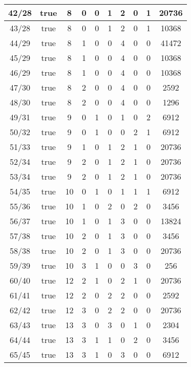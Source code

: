 \begin{frame}
{{\begin{tabular}{|c|c|c|c|c|c|c|c|c|c|}
				\hline
				42/28 & true & 8 & 0 &  0 &  1 &  2 &  0 &  1 & 20736\\
				\hline
				43/28 & true & 8 & 0 &  0 &  1 &  2 &  0 &  1 & 10368\\
				\hline
				44/29 & true & 8 & 1 &  0 &  0 &  4 &  0 &  0 & 41472\\
				\hline
				45/29 & true & 8 & 1 &  0 &  0 &  4 &  0 &  0 & 10368\\
				\hline
				46/29 & true & 8 & 1 &  0 &  0 &  4 &  0 &  0 & 10368\\
				\hline
				47/30 & true & 8 & 2 &  0 &  0 &  4 &  0 &  0 & 2592\\
				\hline
				48/30 & true & 8 & 2 &  0 &  0 &  4 &  0 &  0 & 1296\\
				\hline
				49/31 & true & 9 & 0 &  1 &  0 &  1 &  0 &  2 & 6912\\
				\hline
				50/32 & true & 9 & 0 &  1 &  0 &  0 &  2 &  1 & 6912\\
				\hline
				51/33 & true & 9 & 1 &  0 &  1 &  2 &  1 &  0 & 20736\\
				\hline
				52/34 & true & 9 & 2 &  0 &  1 &  2 &  1 &  0 & 20736\\
				\hline
				53/34 & true & 9 & 2 &  0 &  1 &  2 &  1 &  0 & 20736\\
				\hline
				54/35 & true & 10 & 0 &  1 &  0 &  1 &  1 &  1 & 6912\\
				\hline
				55/36 & true & 10 & 1 &  0 &  2 &  0 &  2 &  0 & 3456\\
				\hline
				56/37 & true & 10 & 1 &  0 &  1 &  3 &  0 &  0 & 13824\\
				\hline
				57/38 & true & 10 & 2 &  0 &  1 &  3 &  0 &  0 & 3456\\
				\hline
				58/38 & true & 10 & 2 &  0 &  1 &  3 &  0 &  0 & 20736\\
				\hline
				59/39 & true & 10 & 3 &  1 &  0 &  0 &  3 &  0 & 256\\
				\hline
				60/40 & true & 12 & 2 &  1 &  0 &  2 &  1 &  0 & 20736\\
				\hline
				61/41 & true & 12 & 2 &  0 &  2 &  2 &  0 &  0 & 2592\\
				\hline
				62/42 & true & 12 & 3 &  0 &  2 &  2 &  0 &  0 & 20736\\
				\hline
				63/43 & true & 13 & 3 &  0 &  3 &  0 &  1 &  0 & 2304\\
				\hline
				64/44 & true & 13 & 3 &  1 &  1 &  0 &  2 &  0 & 3456\\
				\hline
				65/45 & true & 13 & 3 &  1 &  0 &  3 &  0 &  0 & 6912\\

\end{tabular}}}
\end{frame}

